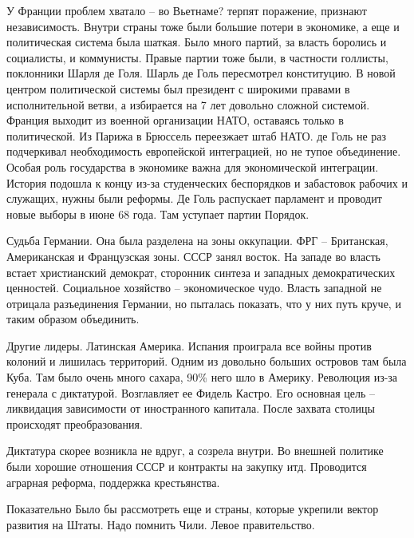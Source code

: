 \documentclass[a4paper, 12pt]{article}
\begin{document}
\begin{multicols}{2}
У Франции проблем хватало -- во Вьетнаме? терпят поражение, признают независимость. Внутри страны тоже были большие потери в экономике, а еще и политическая система была шаткая. Было много партий, за власть боролись и социалисты, и коммунисты. Правые партии тоже были, в частности голлисты, поклонники Шарля де Голя. Шарль де Голь пересмотрел конституцию. В новой центром политической системы был президент с широкими правами в исполнительной ветви, а избирается на 7 лет довольно сложной системой. Франция выходит из военной организации НАТО, оставаясь только в политической. Из Парижа в Брюссель переезжает штаб НАТО. де Голь не раз подчеркивал необходимость европейской интеграцией, но не тупое объединение. Особая роль государства в экономике важна для экономической интеграции. История подошла к концу из-за студенческих беспорядков и забастовок рабочих и служащих, нужны были реформы. Де Голь распускает парламент и проводит новые выборы в июне 68 года. Там уступает партии Порядок. 


Судьба Германии. Она была разделена на зоны оккупации. ФРГ -- Британская, Американская и Французская зоны. СССР занял восток. На западе во власть встает христианский демократ, сторонник синтеза и западных демократических ценностей. Социальное хозяйство -- экономическое чудо. Власть западной не отрицала разъединения Германии, но пыталась показать, что у них путь круче, и таким образом объединить. 

Другие лидеры. Латинская Америка. Испания проиграла все войны против колоний и лишилась территорий. Одним из довольно больших островов там была Куба. Там было очень много сахара, 90\% него шло в Америку. Революция из-за генерала с диктатурой. Возглавляет ее Фидель Кастро. Его основная цель -- ликвидация зависимости от иностранного капитала. После захвата столицы происходят преобразования. 

Диктатура скорее возникла не вдруг, а созрела внутри. Во внешней политике были хорошие отношения СССР и контракты на закупку итд. Проводится аграрная реформа, поддержка крестьянства. 

Показательно Было бы рассмотреть еще и страны, которые укрепили вектор развития на Штаты. Надо помнить Чили. Левое правительство. 



\end{multicols}
\end{document}
